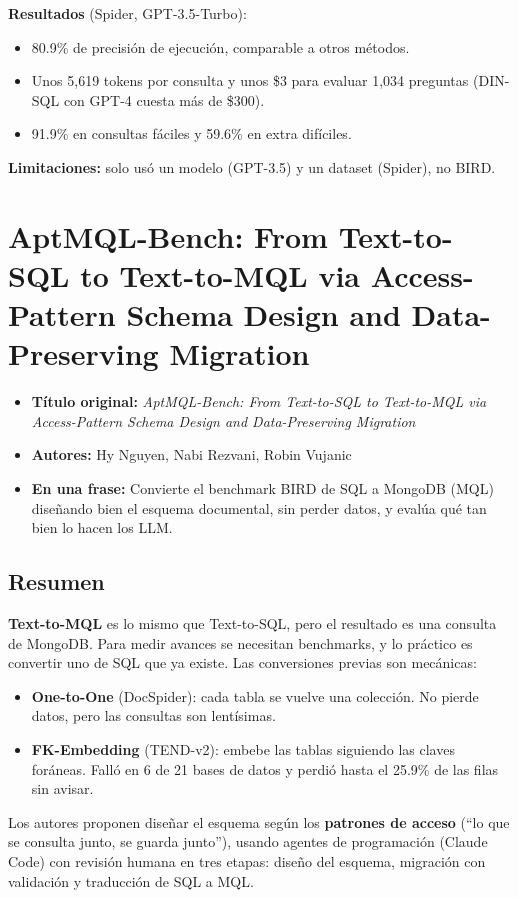 \documentclass[11pt,a4paper]{article}
\newcommand{\ficha}[5]{%
  \begin{itemize}[leftmargin=*, label={}]
    \item \textbf{Título original:} \textit{#1}
    \item \textbf{Autores:} #2
    \item \textbf{En una frase:} #5
  \end{itemize}
}
\begin{document}
\textbf{Resultados} (Spider, GPT-3.5-Turbo):
\begin{itemize}
  \item 80.9\% de precisión de ejecución, comparable a otros métodos.
  \item Unos 5{,}619 tokens por consulta y unos \$3 para evaluar 1{,}034 preguntas (DIN-SQL con GPT-4 cuesta más de \$300).
  \item 91.9\% en consultas fáciles y 59.6\% en extra difíciles.
\end{itemize}

\textbf{Limitaciones:} solo usó un modelo (GPT-3.5) y un dataset (Spider), no BIRD.

\section{AptMQL-Bench: From Text-to-SQL to Text-to-MQL via Access-Pattern Schema Design and Data-Preserving Migration}
\ficha
  {AptMQL-Bench: From Text-to-SQL to Text-to-MQL via Access-Pattern Schema Design and Data-Preserving Migration}
  {Hy Nguyen, Nabi Rezvani, Robin Vujanic}
  {University of Sydney y MongoDB Research}
  {arXiv:2610.02770 (preprint), octubre 2026}
  {Convierte el benchmark BIRD de SQL a MongoDB (MQL) diseñando bien el esquema documental, sin perder datos, y evalúa qué tan bien lo hacen los LLM.}

\subsection*{Resumen}
\textbf{Text-to-MQL} es lo mismo que Text-to-SQL, pero el resultado es una consulta de MongoDB. Para medir avances se necesitan benchmarks, y lo práctico es convertir uno de SQL que ya existe. Las conversiones previas son mecánicas:
\begin{itemize}
  \item \textbf{One-to-One} (DocSpider): cada tabla se vuelve una colección. No pierde datos, pero las consultas son lentísimas.
  \item \textbf{FK-Embedding} (TEND-v2): embebe las tablas siguiendo las claves foráneas. Falló en 6 de 21 bases de datos y perdió hasta el 25.9\% de las filas sin avisar.
\end{itemize}

Los autores proponen diseñar el esquema según los \textbf{patrones de acceso} (``lo que se consulta junto, se guarda junto''), usando agentes de programación (Claude Code) con revisión humana en tres etapas: diseño del esquema, migración con validación y traducción de SQL a MQL.
\end{document}
